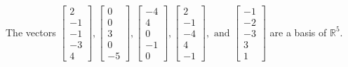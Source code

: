 \begin{exercise}
\begin{exerciseStatement}
  \end{exerciseStatement}
  \begin{exerciseAnswer}
   The vectors \(\left[\begin{array}{r}
2 \\
-1 \\
-1 \\
-3 \\
4
\end{array}\right] , \left[\begin{array}{r}
0 \\
0 \\
3 \\
0 \\
-5
\end{array}\right] , \left[\begin{array}{r}
-4 \\
4 \\
0 \\
-1 \\
0
\end{array}\right] , \left[\begin{array}{r}
2 \\
-1 \\
-4 \\
4 \\
-1
\end{array}\right] , \text{ and } \left[\begin{array}{r}
-1 \\
-2 \\
-3 \\
3 \\
1
\end{array}\right]\) 
  	 are  a basis of \(\mathbb{R}^5\).
  


  \end{exerciseAnswer}
\end{exercise}